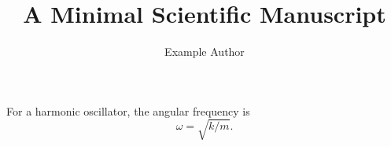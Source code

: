 \documentclass{article}
\title{A Minimal Scientific Manuscript}
\author{Example Author}
\begin{document}
\maketitle
For a harmonic oscillator, the angular frequency is
\begin{equation}
  \omega = \sqrt{k/m}.
\end{equation}
\end{document}
